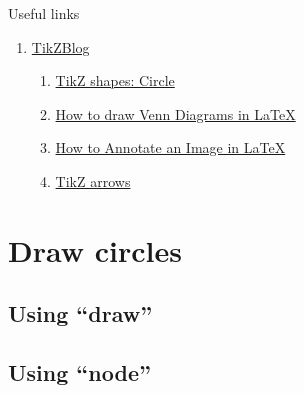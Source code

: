 \documentclass[12pt, letterpaper, oneside]{article}
\begin{document}
Useful links
\begin{enumerate}
  \item \href{https://latexdraw.com/}{TikZBlog}
        \begin{enumerate}
          \item \href{https://latexdraw.com/tikz-shapes-circle/}{TikZ shapes: Circle}
          \item \href{https://latexdraw.com/how-to-draw-venn-diagrams-in-latex/}{How to draw Venn Diagrams in LaTeX}
          \item \href{https://latexdraw.com/how-to-annotate-an-image-in-latex/}{How to Annotate an Image in LaTeX}
          \item \href{https://latexdraw.com/exploring-tikz-arrows/}{TikZ arrows}
        \end{enumerate}
\end{enumerate}

\section{Draw circles}

\subsection{Using ``draw''}


\subsection{Using ``node''}
\end{document}
